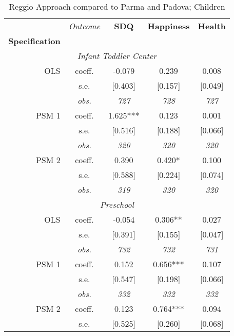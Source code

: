 \begin{table}[H]		
\caption{Reggio Approach compared to Parma and Padova; Children}					
\label{tab:resultsChild-parmapadova}					
 \begin{centering}		
\vspace{1ex}					
\begin{tabular}{ r c ccc}		
\hline \hline		
 & {\textit{Outcome}} & \textbf{SDQ}  & \textbf{Happiness} & \textbf{Health}  \\		
\textbf{Specification}  &  &  &  &  \\		
\hline		
\multicolumn{5}{c}{\textit{Infant Toddler Center }} \\		
\hline		
					
OLS	 & coeff.	 & -0.079	 & 0.239	 & 0.008	\\
	 & s.e.	 & [0.403]	 & [0.157]	 & [0.049]	\\
	 & \textit{obs.}	 & \textit{727}	 & \textit{728}	 & \textit{727}	\\
PSM 1	 & coeff.	 & 1.625***	 & 0.123	 & 0.001	\\
	 & s.e.	 & [0.516]	 & [0.188]	 & [0.066]	\\
	 & \textit{obs.}	 & \textit{320}	 & \textit{320}	 & \textit{320}	\\
PSM 2	 & coeff.	 & 0.390	 & 0.420*	 & 0.100	\\
	 & s.e.	 & [0.588]	 & [0.224]	 & [0.074]	\\
	 & \textit{obs.}	 & \textit{319}	 & \textit{320}	 & \textit{320}	\\
\hline \multicolumn{5}{c}{\textit{Preschool }} \\ \hline					
OLS	 & coeff.	 & -0.054	 & 0.306**	 & 0.027	\\
	 & s.e.	 & [0.391]	 & [0.155]	 & [0.047]	\\
	 & \textit{obs.}	 & \textit{732}	 & \textit{732}	 & \textit{731}	\\
PSM 1	 & coeff.	 & 0.152	 & 0.656***	 & 0.107	\\
	 & s.e.	 & [0.547]	 & [0.198]	 & [0.066]	\\
	 & \textit{obs.}	 & \textit{332}	 & \textit{332}	 & \textit{332}	\\
PSM 2	 & coeff.	 & 0.123	 & 0.764***	 & 0.094	\\
	 & s.e.	 & [0.525]	 & [0.260]	 & [0.068]	\\

\end{tabular}
\end{centering}
\end{table}
